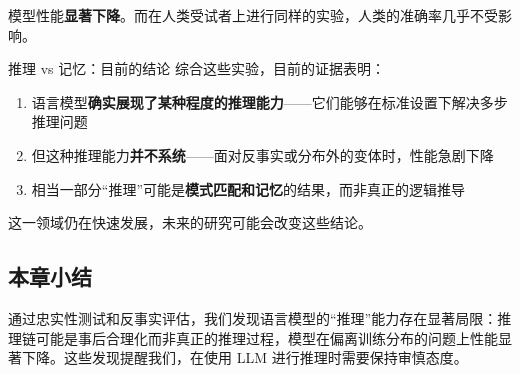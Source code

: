 模型性能\textbf{显著下降}。而在人类受试者上进行同样的实验，人类的准确率几乎不受影响。

\begin{importantbox}{推理 vs 记忆：目前的结论}
综合这些实验，目前的证据表明：
\begin{enumerate}
    \item 语言模型\textbf{确实展现了某种程度的推理能力}——它们能够在标准设置下解决多步推理问题
    \item 但这种推理能力\textbf{并不系统}——面对反事实或分布外的变体时，性能急剧下降
    \item 相当一部分``推理''可能是\textbf{模式匹配和记忆}的结果，而非真正的逻辑推导
\end{enumerate}
这一领域仍在快速发展，未来的研究可能会改变这些结论。
\end{importantbox}

\subsection{本章小结}

通过忠实性测试和反事实评估，我们发现语言模型的``推理''能力存在显著局限：推理链可能是事后合理化而非真正的推理过程，模型在偏离训练分布的问题上性能显著下降。这些发现提醒我们，在使用 LLM 进行推理时需要保持审慎态度。


